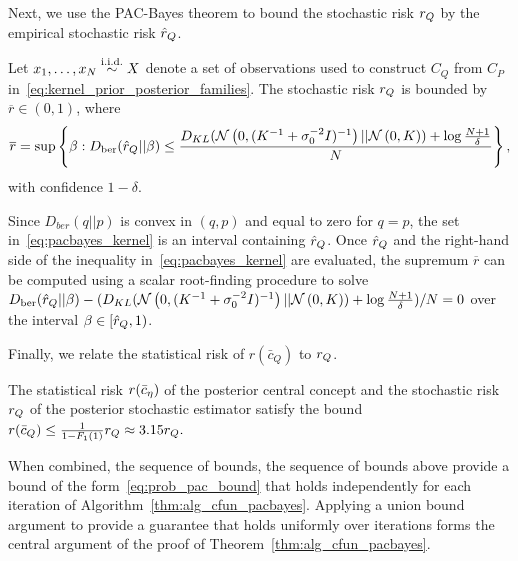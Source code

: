 \documentclass[onefignum,onetabnum]{siamart171218}
\begin{document}
Next, we use the PAC-Bayes theorem to bound the stochastic risk $\srisk$ by the
empirical stochastic risk $\esrisk$. 

\begin{lemma}
    \label{lem:sriskbound_kernel}
   Let $x_1,\dotsc,x_N\simiid X$ denote a set of observations used to construct
   $C_{Q}$ from $C_{P}$
   in~\eqref{eq:kernel_prior_posterior_families}. The stochastic risk $\srisk$
   is bounded by $\overline{r}\in(0,1)$, 
   where
   \begin{equation}
       \label{eq:pacbayes_kernel}
       \overline{r}=\sup
       \left\{ \beta :
       D_{\text{ber}}(\esrisk || \beta)
       \le
       \frac{D_{KL}(\Norm{0,(K^{-1}+\sigma_0^{-2}I)^{-1}} || \Norm{0,K})
       + \log\frac{N+1}{\delta}
       }{N}\right\},
   \end{equation}
   with confidence $1-\delta$.
\end{lemma}
Since $D_{ber}(q||p)$ is convex in $(q,p)$ and equal to zero for $q=p$, the set
in~\eqref{eq:pacbayes_kernel} is an interval containing $\esrisk$.
Once $\esrisk$ and the right-hand side of the inequality
in~\eqref{eq:pacbayes_kernel} are evaluated, the supremum $\overline{r}$ can be
computed using a scalar root-finding procedure to solve
$
D_{\text{ber}}(\esrisk || \beta)
-
(D_{KL}(\Norm{0,(K^{-1}+\sigma_0^{-2}I)^{-1}} || \Norm{0,K})
+ \log\frac{N+1}{\delta}
)/N = 0
$ over the interval $\beta\in[\esrisk,1)$.

Finally, we relate the statistical risk of $r(\bar{c}_Q)$ to $\srisk$.

\begin{lemma}
    \label{lem:central_concept_risk_bound}
    The statistical risk $\risk[\bar{c}_\eta]$ of the posterior central concept
    and the stochastic risk $\srisk$ of the posterior stochastic estimator
    satisfy the
    bound
        $
        r(\bar{c}_Q) \le \frac{1}{1-F_1(1)}\srisk\approx 3.15\srisk.
        $
\end{lemma}

When combined, the sequence of bounds, the sequence of bounds above provide a
bound of the form~\eqref{eq:prob_pac_bound} that holds independently for each
iteration of Algorithm~\ref{thm:alg_cfun_pacbayes}. Applying a union bound
argument to provide a guarantee that holds uniformly over iterations
forms the central argument of the proof of Theorem~\ref{thm:alg_cfun_pacbayes}.
\end{document}

